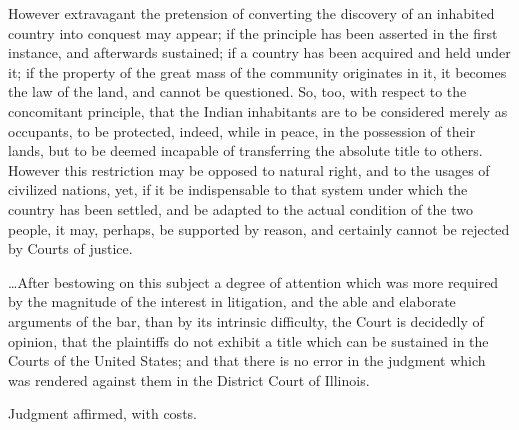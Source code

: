 However extravagant the pretension of converting the discovery of an inhabited
country into conquest may appear; if the principle has been asserted in the
first instance, and afterwards sustained; if a country has been acquired and
held under it; if the property of the great mass of the community originates in
it, it becomes the law of the land, and cannot be questioned. So, too, with
respect to the concomitant principle, that the Indian inhabitants are to be
considered merely as occupants, to be protected, indeed, while in peace, in the
possession of their lands, but to be deemed incapable of transferring the
absolute title to others. However this restriction may be opposed to natural
right, and to the usages of civilized nations, yet, if it be indispensable to
that system under which the country has been settled, and be adapted to the
actual condition of the two people, it may, perhaps, be supported by reason, and
certainly cannot be rejected by Courts of justice.

\ldots After bestowing on this subject a degree of attention which was more
required by the magnitude of the interest in litigation, and the able and
elaborate arguments of the bar, than by its intrinsic difficulty, the Court is
decidedly of opinion, that the plaintiffs do not exhibit a title which can be
sustained in the Courts of the United States; and that there is no error in the
judgment which was rendered against them in the District Court of Illinois.

Judgment affirmed, with costs.

